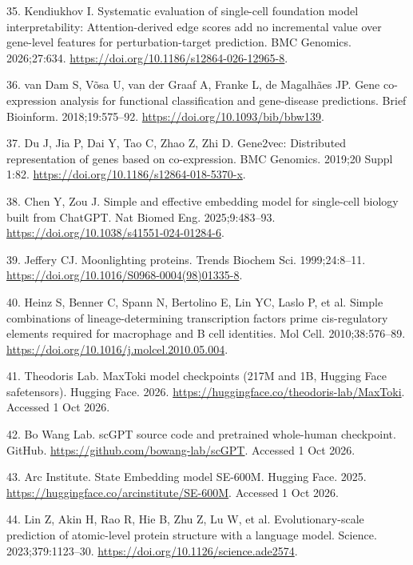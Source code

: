 \documentclass[
  11pt,
]{article}
\newlength{\cslhangindent}
\newenvironment{CSLReferences}[2] %
 {\begin{list}{}{%
  \setlength{\itemindent}{0pt}
  \setlength{\leftmargin}{0pt}
  \setlength{\parsep}{0pt}
  \ifodd #1
   \setlength{\leftmargin}{\cslhangindent}
   \setlength{\itemindent}{-1\cslhangindent}
  \fi
  \setlength{\itemsep}{#2\baselineskip}}}
 {\end{list}}
\begin{document}
\begin{CSLReferences}{0}{1}
35. Kendiukhov I. Systematic evaluation of single-cell foundation model
interpretability: Attention-derived edge scores add no incremental value
over gene-level features for perturbation-target prediction. BMC
Genomics. 2026;27:634. \url{https://doi.org/10.1186/s12864-026-12965-8}.

36. {van Dam S, Võsa U, van der Graaf A, Franke L, de Magalhães JP}.
Gene co-expression analysis for functional classification and
gene-disease predictions. Brief Bioinform. 2018;19:575--92.
\url{https://doi.org/10.1093/bib/bbw139}.

37. Du J, Jia P, Dai Y, Tao C, Zhao Z, Zhi D. {Gene2vec}: Distributed
representation of genes based on co-expression. BMC Genomics. 2019;20
Suppl 1:82. \url{https://doi.org/10.1186/s12864-018-5370-x}.

38. Chen Y, Zou J. Simple and effective embedding model for single-cell
biology built from {ChatGPT}. Nat Biomed Eng. 2025;9:483--93.
\url{https://doi.org/10.1038/s41551-024-01284-6}.

39. Jeffery CJ. Moonlighting proteins. Trends Biochem Sci.
1999;24:8--11. \url{https://doi.org/10.1016/S0968-0004(98)01335-8}.

40. Heinz S, Benner C, Spann N, Bertolino E, Lin YC, Laslo P, et al.
Simple combinations of lineage-determining transcription factors prime
cis-regulatory elements required for macrophage and {B} cell identities.
Mol Cell. 2010;38:576--89.
\url{https://doi.org/10.1016/j.molcel.2010.05.004}.

41. Theodoris Lab. {MaxToki} model checkpoints (217M and 1B, {Hugging
Face} safetensors). Hugging Face. 2026.
\url{https://huggingface.co/theodoris-lab/MaxToki}. Accessed 1 Oct 2026.

42. Bo Wang Lab. {scGPT} source code and pretrained whole-human
checkpoint. GitHub. \url{https://github.com/bowang-lab/scGPT}. Accessed
1 Oct 2026.

43. Arc Institute. {State Embedding} model {SE-600M}. Hugging Face.
2025. \url{https://huggingface.co/arcinstitute/SE-600M}. Accessed 1 Oct
2026.

44. {Lin Z, Akin H, Rao R, Hie B, Zhu Z, Lu W, et al.}
Evolutionary-scale prediction of atomic-level protein structure with a
language model. Science. 2023;379:1123--30.
\url{https://doi.org/10.1126/science.ade2574}.


\end{CSLReferences}
\end{document}
